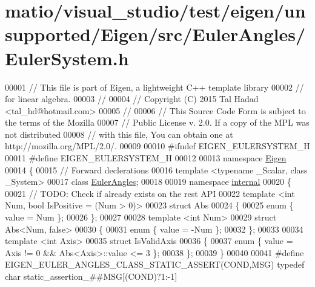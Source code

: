 \hypertarget{matio_2visual__studio_2test_2eigen_2unsupported_2_eigen_2src_2_euler_angles_2_euler_system_8h_source}{}\section{matio/visual\+\_\+studio/test/eigen/unsupported/\+Eigen/src/\+Euler\+Angles/\+Euler\+System.h}
\label{matio_2visual__studio_2test_2eigen_2unsupported_2_eigen_2src_2_euler_angles_2_euler_system_8h_source}

\begin{DoxyCode}
00001 \textcolor{comment}{// This file is part of Eigen, a lightweight C++ template library}
00002 \textcolor{comment}{// for linear algebra.}
00003 \textcolor{comment}{//}
00004 \textcolor{comment}{// Copyright (C) 2015 Tal Hadad <tal\_hd@hotmail.com>}
00005 \textcolor{comment}{//}
00006 \textcolor{comment}{// This Source Code Form is subject to the terms of the Mozilla}
00007 \textcolor{comment}{// Public License v. 2.0. If a copy of the MPL was not distributed}
00008 \textcolor{comment}{// with this file, You can obtain one at http://mozilla.org/MPL/2.0/.}
00009 
00010 \textcolor{preprocessor}{#ifndef EIGEN\_EULERSYSTEM\_H}
00011 \textcolor{preprocessor}{#define EIGEN\_EULERSYSTEM\_H}
00012 
00013 \textcolor{keyword}{namespace }\hyperlink{namespace_eigen}{Eigen}
00014 \{
00015   \textcolor{comment}{// Forward declerations}
00016   \textcolor{keyword}{template} <\textcolor{keyword}{typename} \_Scalar, \textcolor{keyword}{class} \_System>
00017   \textcolor{keyword}{class }\hyperlink{class_euler_angles}{EulerAngles};
00018   
00019   \textcolor{keyword}{namespace }\hyperlink{namespaceinternal}{internal}
00020   \{
00021     \textcolor{comment}{// TODO: Check if already exists on the rest API}
00022     \textcolor{keyword}{template} <\textcolor{keywordtype}{int} Num, \textcolor{keywordtype}{bool} IsPositive = (Num > 0)>
00023     \textcolor{keyword}{struct} Abs
00024     \{
00025       \textcolor{keyword}{enum} \{ value = Num \};
00026     \};
00027   
00028     \textcolor{keyword}{template} <\textcolor{keywordtype}{int} Num>
00029     \textcolor{keyword}{struct }Abs<Num, false>
00030     \{
00031       \textcolor{keyword}{enum} \{ value = -Num \};
00032     \};
00033 
00034     \textcolor{keyword}{template} <\textcolor{keywordtype}{int} Axis>
00035     \textcolor{keyword}{struct }IsValidAxis
00036     \{
00037       \textcolor{keyword}{enum} \{ value = Axis != 0 && Abs<Axis>::value <= 3 \};
00038     \};
00039   \}
00040   
00041 \textcolor{preprocessor}{  #define EIGEN\_EULER\_ANGLES\_CLASS\_STATIC\_ASSERT(COND,MSG) typedef char static\_assertion\_##MSG[(COND)?1:-1]}

\end{DoxyCode}
